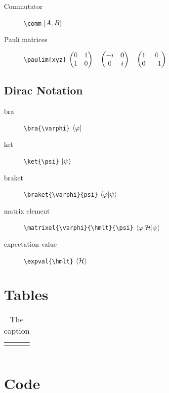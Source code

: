 \documentclass[a4paper]{article}
\begin{document}
\begin{description}
	\item[Commutator] \verb|\comm| \quad $\left[ A, B \right]$
	\item[Pauli matrices] \verb|\paulim[xyz]| \quad $\begin{pmatrix}0 & 1 \\ 1 & 0\end{pmatrix} \quad \begin{pmatrix}-i & 0 \\ 0 & i\end{pmatrix} \quad \begin{pmatrix}1 & 0 \\ 0 & -1\end{pmatrix}$
\end{description}


\subsection{Dirac Notation}

\begin{description}
	\item[bra] \verb|\bra{\varphi}| \quad $\left\langle{} \varphi \right|$
	\item[ket] \verb|\ket{\psi}| \quad $\left| \psi \right\rangle$
	\item[braket] \verb|\braket{\varphi}{psi}| \quad $\left\langle{} \varphi \middle| \psi \right\rangle$
	\item[matrix element] \verb|\matrixel{\varphi}{\hmlt}{\psi}| \quad $\left\langle \varphi \middle| \mathcal{H} \middle| \psi \right\rangle$
	\item[expectation value] \verb|\expval{\hmlt}| \quad $\left\langle{} \mathcal{H} \right\rangle$
\end{description}

\section{Tables}

\begin{table}
	\begin{tabu}{rr}
	\tabucline[1pt]{-}
	\end{tabu}
	\caption{The caption}
\end{table}


\begin{sidewaystable}
	\centering
	\begin{tabular}{r|c|l}
	\end{tabular}
\end{sidewaystable}

\section{Code}
\end{document}
